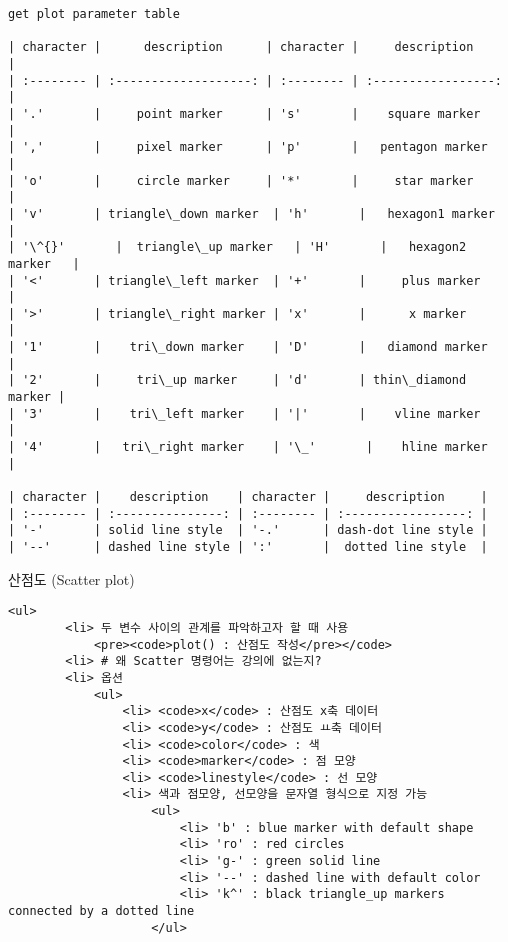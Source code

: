 \documentclass[11pt]{article}
\begin{document}
    \begin{Verbatim}[commandchars=\\\{\}]
get plot parameter table

| character |      description      | character |     description     |
| :-------- | :-------------------: | :-------- | :-----------------: |
| '.'       |     point marker      | 's'       |    square marker    |
| ','       |     pixel marker      | 'p'       |   pentagon marker   |
| 'o'       |     circle marker     | '*'       |     star marker     |
| 'v'       | triangle\_down marker  | 'h'       |   hexagon1 marker   |
| '\^{}'       |  triangle\_up marker   | 'H'       |   hexagon2 marker   |
| '<'       | triangle\_left marker  | '+'       |     plus marker     |
| '>'       | triangle\_right marker | 'x'       |      x marker       |
| '1'       |    tri\_down marker    | 'D'       |   diamond marker    |
| '2'       |     tri\_up marker     | 'd'       | thin\_diamond marker |
| '3'       |    tri\_left marker    | '|'       |    vline marker     |
| '4'       |   tri\_right marker    | '\_'       |    hline marker     |

| character |    description    | character |     description     |
| :-------- | :---------------: | :-------- | :-----------------: |
| '-'       | solid line style  | '-.'      | dash-dot line style |
| '--'      | dashed line style | ':'       |  dotted line style  |

    \end{Verbatim}

    산점도 (Scatter plot)

\begin{verbatim}
<ul>
        <li> 두 변수 사이의 관계를 파악하고자 할 때 사용
            <pre><code>plot() : 산점도 작성</pre></code>
        <li> # 왜 Scatter 명령어는 강의에 없는지?
        <li> 옵션
            <ul>
                <li> <code>x</code> : 산점도 x축 데이터
                <li> <code>y</code> : 산점도 ㅛ축 데이터
                <li> <code>color</code> : 색
                <li> <code>marker</code> : 점 모양
                <li> <code>linestyle</code> : 선 모양
                <li> 색과 점모양, 선모양을 문자열 형식으로 지정 가능
                    <ul>
                        <li> 'b' : blue marker with default shape
                        <li> 'ro' : red circles
                        <li> 'g-' : green solid line
                        <li> '--' : dashed line with default color
                        <li> 'k^' : black triangle_up markers connected by a dotted line
                    </ul>
\end{verbatim}
\end{document}
